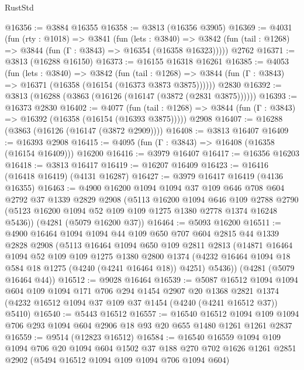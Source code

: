 \begin{lexlean}{RustStd}
\begin{coremodule}
{\begin{coremodule}
{{{{{{{{{{{{{{{{{{{{{{{{{{{{{{{{{{{@16356 := @3884 @16355
@16358 := @3813 (@16356 @3905)
@16369 := @4031
    (fun (rty : @1018) =>
    @3841
      (fun (lets : @3840) =>
      @3842 (fun (tail : @1268) => @3844 (fun (Γ : @3843) => @16354 (@16358 @16323)))))
    @2762
@16371 := @3813 (@16288 @16150)
@16373 := @16155 @16318 @16261
@16385 := @4053
    (fun (lets : @3840) =>
    @3842
      (fun (tail : @1268) =>
      @3844 (fun (Γ : @3843) => @16371 (@16358 (@16154 (@16373 @3873 @3875))))))
    @2830
@16392 := @3813 (@16288 (@3863 (@16126 (@16147 (@3872 (@2831 @3875))))))
@16393 := @16373 @2830
@16402 := @4077
    (fun (tail : @1268) => @3844 (fun (Γ : @3843) => @16392 (@16358 (@16154 (@16393 @3875)))))
    @2908
@16407 := @16288 (@3863 (@16126 (@16147 (@3872 @2909))))
@16408 := @3813 @16407
@16409 := @16393 @2908
@16415 := @4095 (fun (Γ : @3843) => @16408 (@16358 (@16154 @16409))) @16200
@16416 := @3979 @16407
@16417 := @16356 @16203
@16418 := @3813 @16417
@16419 := @16207 @16409
@16423 := @16416 (@16418 @16419) (@4131 @16287)
@16427 := @3979 @16417 @16419 (@4136 @16355)
@16463 := @4900
    @16200
    @1094
    @1094
    @37
    @109
    @646
    @708
    @604
    @2792
    @37
    @1339
    @2829
    @2908
    (@5113
      @16200
      @1094
      @646
      @109
      @2788
      @2790
      (@5123 @16200 @1094 @52 @109 @109 @1275 @1380 @2778 @1374 @16248 @5436))
    (@4281 (@5079 @16200 @37))
@16464 := @5093 @16200
@16511 := @4900
    @16464
    @1094
    @1094
    @44
    @109
    @650
    @707
    @604
    @2815
    @44
    @1339
    @2828
    @2908
    (@5113
      @16464
      @1094
      @650
      @109
      @2811
      @2813
      (@14871
        @16464
        @1094
        @52
        @109
        @109
        @1275
        @1380
        @2800
        @1374
        (@4232 @16464 @1094 @18 @584 @18 @1275 (@4240 (@4241 @16464 @18)) @4251)
        @5436))
    (@4281 (@5079 @16464 @44))
@16512 := @9028 @16464
@16539 := @5087
    @16512
    @1094
    @1094
    @604
    @109
    @1094
    @171
    @706
    @294
    @1454
    @2907
    @20
    @1368
    @2821
    @1374
    (@4232 @16512 @1094 @37 @109 @37 @1454 (@4240 (@4241 @16512 @37)) @5410)
@16540 := @5443 @16512
@16557 := @16540
    @16512
    @1094
    @109
    @1094
    @706
    @293
    @1094
    @604
    @2906
    @18
    @93
    @20
    @655
    @1480
    @1261
    @1261
    @2837
@16559 := @9514 (@12823 @16512)
@16584 := @16540
    @16559
    @1094
    @109
    @1094
    @706
    @20
    @1094
    @604
    @1502
    @37
    @188
    @270
    @702
    @1626
    @1261
    @2851
    @2902
    (@5494 @16512 @1094 @109 @1094 @706 @1094 @604)
}}}}}}}}}}}}}}}}}}}}}}}}}}}}}}}}}}}
\end{coremodule}}
\end{coremodule}
\end{lexlean}
